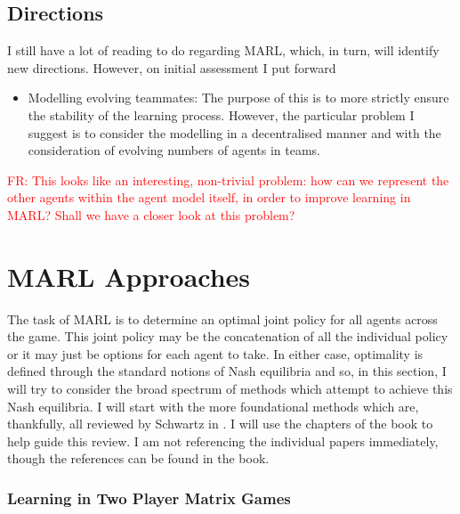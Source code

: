\documentclass[preprint,11pt]{report}
\newcommand\fr[1]{\textcolor{red}{FR: #1}}
\begin{document}
\subsection{Directions}

I still have a lot of reading to do regarding MARL, which, in turn, will identify new directions.
However, on initial assessment I put forward

\begin{itemize} \item Modelling evolving teammates: The purpose of this is to more strictly ensure
the stability of the learning process. However, the particular problem I suggest is to consider the
modelling in a decentralised manner and with the consideration of evolving numbers of agents in
teams. \end{itemize}

\fr{This looks like an interesting, non-trivial problem: how can we
  represent the other agents within the agent model itself, in order
  to improve learning in MARL? Shall we have a closer look at this problem?}


\section{MARL Approaches} \label{sec::MARL Approaches}

The task of MARL is to determine an optimal joint policy for all agents across the game. This joint
policy may be the concatenation of all the individual policy or it may just be options for each
agent to take. In either case, optimality is defined through the standard notions of Nash equilibria
and so, in this section, I will try to consider the broad spectrum of methods which attempt to
achieve this Nash equilibria. I will start with the more foundational methods which are, thankfully,
all reviewed by Schwartz in  \cite{SchwartzMulti-agentApproach}. I will use the chapters of the book
to help guide this review. I am not referencing the individual papers immediately, though the
references can be found in the book.

\subsubsection*{Learning in Two Player Matrix Games}
\end{document}
